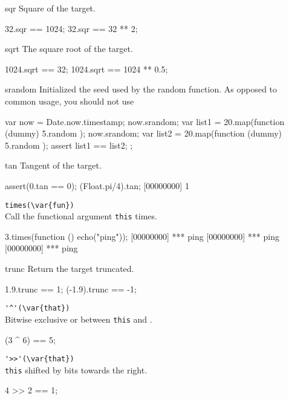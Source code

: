 \begin{urbiscriptapi}
\item[sqr]
  Square of the target.
\begin{urbiassert}
32.sqr == 1024;
32.sqr == 32 ** 2;
\end{urbiassert}

\item[sqrt]
  The square root of the target.
\begin{urbiassert}
1024.sqrt == 32;
1024.sqrt == 1024 ** 0.5;
\end{urbiassert}

\item[srandom]
  Initialized the seed used by the random function.  As opposed to common
  usage, you should not use
\begin{urbiunchecked}
{
  var now = Date.now.timestamp;
  now.srandom;
  var list1 = 20.map(function (dummy) { 5.random });
  now.srandom;
  var list2 = 20.map(function (dummy) { 5.random });
  assert
  {
    list1 == list2;
  }
};
\end{urbiunchecked}

\item[tan]
  Tangent of the target.
\begin{urbiscript}
assert(0.tan == 0);
(Float.pi/4).tan;
[00000000] 1
\end{urbiscript}

\item \lstinline|times(\var{fun})|\\
  Call the functional argument  \lstinline|this| times.

\begin{urbiscript}
3.times(function () { echo("ping")});
[00000000] *** ping
[00000000] *** ping
[00000000] *** ping
\end{urbiscript}

\item[trunc]
  Return the target truncated.
\begin{urbiassert}
1.9.trunc == 1;
(-1.9).trunc == -1;
\end{urbiassert}

\item \lstinline|'^'(\var{that})|\\
  Bitwise exclusive or between \lstinline|this| and .
\begin{urbiassert}
(3 ^ 6) == 5;
\end{urbiassert}

\item \lstinline|'>>'(\var{that})|\\%
  \lstinline|this| shifted by  bits towards the right.
\begin{urbiassert}
4 >> 2 == 1;
\end{urbiassert}


\end{urbiscriptapi}
